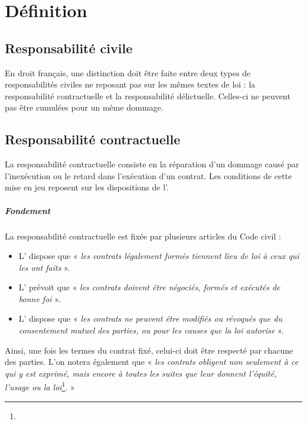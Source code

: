 
\chapter{Définition}

\section{Responsabilité civile}

  En droit français, une distinction doit être faite entre deux types de responsabilités civiles ne reposant pas sur les mêmes textes de loi : la responsabilité contractuelle et la responsabilité délictuelle. Celles-ci ne peuvent pas être cumulées pour un même dommage.

\section{Responsabilité contractuelle}\label{responsabiliteContractuelle}

  La responsabilité contractuelle consiste en la réparation d'un dommage causé par l'inexécution ou le retard dans l'exécution d'un contrat. Les conditions de cette mise en jeu reposent sur les dispositions de l'.

  \paragraph{Fondement}
  La responsabilité contractuelle est fixée par plusieurs articles du Code civil :
  \begin{itemize}
    \item L' dispose que « \emph{les contrats légalement formés tiennent lieu de loi à ceux qui les ont faits} ».
    \item L' prévoit que « \emph{les contrats doivent être négociés, formés et exécutés de bonne foi} ».
    \item L' dispose que « \emph{les contrats ne peuvent être modifiés ou révoqués que du consentement mutuel des parties, ou pour les causes que la loi autorise} ».
  \end{itemize}

  Ainsi, une fois les termes du contrat fixé, celui-ci doit être respecté par chacune des parties. L'on notera également que « \emph{les contrats obligent non seulement à ce qui y est exprimé, mais encore à toutes les suites que leur donnent l'équité, l'usage ou la loi}\footnote{}. »

